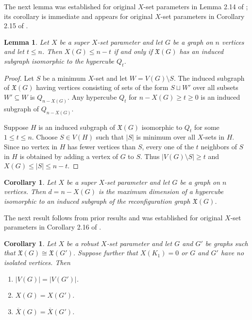 \documentclass{article}
\def\blu{\color{blue}}
\numberwithin{figure}{section}
\numberwithin{table}{section}
\numberwithin{equation}{section}
\newtheorem{cor}[thm]{Corollary}
\newtheorem{lem}[thm]{Lemma}
\theoremstyle{definition}
\theoremstyle{definition}
\theoremstyle{definition}
\newcommand{\ben}{\begin{enumerate}}
\newcommand{\een}{\end{enumerate}}
\newcommand{\bpf}{\begin{proof}}
\newcommand{\epf}{\end{proof}\ms}
\newcommand{\ms}{\medskip}
\newcommand{\ol}{\overline}
\newcommand{\xbar}{\ol X}
\newcommand{\xtar}{\mathfrak{X}}%
\begin{document}
{  The next lemma was established for original $X$-set parameters in Lemma 2.14 of \cite{PDrecon}; its corollary is immediate and appears for original $X$-set parameters in Corollary 2.15 of \cite{PDrecon}. %
 
\begin{lem}\label{L:uembedQt} Let $X$ be a super $X$-set parameter and let $G$ be a graph on $n$ vertices and let $t \leq n$. Then   $X(G)\leq n-t$ if and only if $\xtar(G)$ has an induced subgraph isomorphic to the hypercube $Q_t$. 
\end{lem}
{\blu
\bpf %
Let $S$ be a minimum $X$-set and let $W=V(G)\setminus S$.  The induced subgraph of $\xtar(G)$ having vertices consisting of sets of the form $S\sqcup W'$ over all subsets $W'\subseteq W$  is $Q_{n-X(G)}$.  Any hypercube $Q_{t}$ for $n-X(G)\ge t\ge 0$ is an induced subgraph of $Q_{n-X(G)}$.

 Suppose $H$ is an induced subgraph of $\xtar(G)$ isomorphic to $Q_t$ for some $1\leq t \leq n$. Choose $S \in V(H)$ such that $|S|$ is minimum over all $X$-sets in $H$.  Since no vertex in $H$ has fewer vertices than $S$, every one of the $t$ neighbors of $S$ in $H$ is obtained by adding a vertex of $G$ to $S$.  Thus $|V(G)\setminus S| \ge t$ and $X(G) \le |S|\le n-t$.
\epf 
}


\begin{cor}\label{c:X-Qt}Let $X$ be a super $X$-set parameter  and let $G$ be a graph on $n$ vertices.  
Then $d=n-X(G)$ is the  maximum dimension of a hypercube isomorphic to an induced subgraph of the reconfiguration graph %
 $\xtar(G)$. 
\end{cor}



 The next result follows from prior results and was established for original $X$-set parameters in Corollary 2.16 of \cite{PDrecon}. 
\begin{cor}\label{c:u-iso-props} Let $X$ be a robust $X$-set parameter  and
let $G$ and $G'$ be graphs such that $\xtar(G)\cong\xtar(G')$.  Suppose further that $X(K_1)=0$ or $G$ and $G'$ have no isolated vertices. Then 
\ben
\item $|V(G)|=|V(G')|$.
\item $X(G)=X(G')$.
\item $\xbar(G)=\xbar(G')$. 
\een
\end{cor}

}
\end{document}
